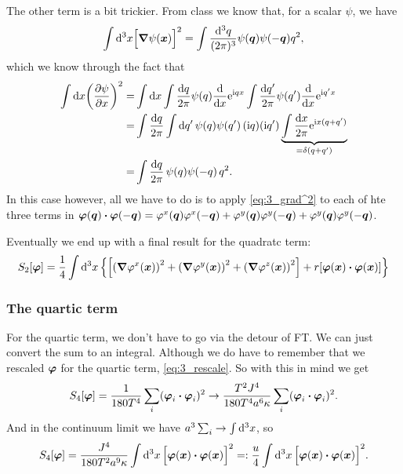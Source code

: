 \documentclass[11pt,letter, swedish, english
]{article}
\begin{document}
The other term is a bit trickier. From class we know that, for a
scalar $\psi$, we have
\begin{equation}\label{eq:3_grad^2}
\int\rd^3x \Big[\grad\psi(\vb*x)\Big]^2
=\int\frac{\rd^3q}{(2\pi)^3}\psi(\vb*q)\psi(-\vb*q)q^2,
\end{equation}
which we know through the fact that
\begin{equation}
\begin{aligned}
\int\rd{x}\qty(\pdv{\psi}{x})^2=&
\int\rd{x}\int\frac{\rd{q}}{2\pi}\psi(q)\dv{x}\ee^{\ii qx}
\int\frac{\rd{q'}}{2\pi}\psi(q')\dv{x}\ee^{\ii q'x}\\
=&\int\frac{\rd{q}}{2\pi}\int\rd{q'}\,\psi(q)\psi(q')\,(\ii q)(\ii q')
\underbrace{\int\frac{\rd{x}}{2\pi}\ee^{\ii x(q+q')}}_{=\delta(q+q')}\\
=&\int\frac{\rd{q}}{2\pi}\,\psi(q)\psi(-q)\,q^2.
\end{aligned}
\end{equation}
In this case however, all we have to do is to apply
\eqref{eq:3_grad^2} to each of hte three terms in 
$\vb*\varphi(\vb*q)\vdot\vb*\varphi(-\vb*q)
=\varphi^x(\vb*q)\varphi^x(-\vb*q)
+\varphi^y(\vb*q)\varphi^y(-\vb*q)+
\varphi^y(\vb*q)\varphi^y(-\vb*q)$. 

Eventually we end up with a final result for the quadratc term:
\begin{equation}
S_2[\vb*\varphi]=\frac{1}{4}\int\rd^3x\,
\qty{\qty[\qty(\grad\varphi^x(\vb*x))^2
+\qty(\grad\varphi^y(\vb*x))^2
+\qty(\grad\varphi^z(\vb*x))^2]
+r[\vb*\varphi(\vb*x)\vdot\vb*\varphi(\vb*x)]}
\end{equation}


\subsubsection{The quartic term}
For the quartic term, we don't have to go via the detour of FT. We can
just convert the sum to an integral. Although we do have to remember that we
rescaled $\vb*\varphi$ for the quartic term, \eqref{eq:3_rescale}. So
with this in mind we get
\begin{equation}
S_4[\vb*\varphi]=
\frac{1}{180T^4}\sum_i(\vb*\varphi_i\vdot\vb*\varphi_i)^2
\to \frac{T^2J^4}{180T^4a^6\kappa}
\sum_i(\vb*\varphi_i\vdot\vb*\varphi_i)^2.
\end{equation}
And in the continuum limit we have
$a^3\sum_i\to\int\rd^3x$, so 
\begin{equation}
S_4[\vb*\varphi]=\frac{J^4}{180T^2a^9\kappa}
\int\rd^3x\,\Big[\vb*\varphi(\vb*x)\vdot\vb*\varphi(\vb*x)\Big]^2
=:\frac{u}{4}
\int\rd^3x\,\Big[\vb*\varphi(\vb*x)\vdot\vb*\varphi(\vb*x)\Big]^2.
\end{equation}
\end{document}
